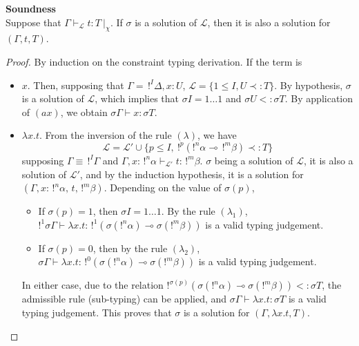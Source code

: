 \begin{prop}{\bf Soundness} \\
	Suppose that $\Gamma \vdash_\mathcal{L} t : T ~|_\chi$. If $\sigma$ is a solution
	of $\mathcal{L}$, then it is also a solution for $(\Gamma, t, T)$.

	\begin{proof}
 		By induction on the constraint typing derivation. If the term is
 		\begin{itemize}
 		\item $x$. Then, supposing that $\Gamma = \,!^I\Delta, x : U$, $\mathcal{L} = \{ 1 \le I, U \prec: T \}$. By hypothesis, $\sigma$ is a solution
 			of $\mathcal{L}$, which implies that $\sigma I = 1 \dots 1$ and $\sigma U <: \sigma T$.
 			By application of $(ax)$, we obtain $\sigma \Gamma \vdash x : \sigma T$.
 			
 		\item $\lambda x.t$. From the inversion of the rule $(\lambda)$, we have
		 		$$\mathcal{L} = \mathcal{L'} \cup \{p \le I, ~!^p(!^n\alpha \multimap \,!^m\beta) \prec: T\}$$
		 	supposing $\Gamma \equiv \,!^I \Gamma$ and $\Gamma, x : \,!^n\alpha \vdash_\mathcal{L'} t : \,!^m\beta$.
		 	$\sigma$ being a solution of $\mathcal{L}$, it is also a solution of $\mathcal{L'}$, and
		 	by the induction hypothesis, it is a solution for $(\Gamma, x : \,!^n\alpha, \,t, \,!^m\beta)$. Depending on the value
		 	of $\sigma (p)$,
		 	\begin{itemize}
		 		\item If $\sigma(p) = 1$, then $\sigma I = 1 \dots 1$. By the rule $(\lambda_1)$,
		 			$!^1\sigma\Gamma \vdash \lambda x.t : \,!^1(\sigma(!^n \alpha) \multimap \sigma(!^m \beta))$ is a valid typing judgement.
		 			
		 		\item If $\sigma(p) = 0$, then by the rule $(\lambda_2)$,
		 			$\sigma\Gamma \vdash \lambda x.t : \,!^0(\sigma(!^n \alpha) \multimap \sigma(!^m \beta))$ is a valid typing judgement.
		 	\end{itemize}
			In either case, due to the relation $!^{\sigma(p)} (\sigma(!^n\alpha) \multimap \sigma(!^m\beta)) <: \sigma T$, the admissible rule
			(sub-typing) can be applied, and $\sigma \Gamma \vdash \lambda x . t : \sigma T$ is a valid typing judgement.
			This proves that $\sigma$ is a solution for $(\Gamma, \lambda x.t, T)$.
		

\end{itemize}
\end{proof}
\end{prop}

